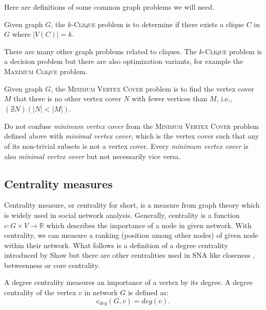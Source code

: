 Here are definitions of some common \NPh graph problems we will need.

\begin{definition}
    Given graph $G$, the $k$-\textsc{Clique} problem is to determine if
    there exists a clique $C$ in $G$ where $|V(C)| = k$.
\end{definition}
There are many other graph problems related to cliques. The $k$-\textsc{Clique} problem is a decision problem but
there are also optimization variants, for example the \textsc{Maximum Clique} problem.

\begin{definition}
    Given graph $G$, the \textsc{Minimum Vertex Cover} problem is to find
    the vertex cover $M$ that there is no other vertex cover $N$ with fewer vertices than $M$, i.e., 
    $(\nexists N)(|N| < |M|)$.
\end{definition}
Do not confuse \emph{minimum vertex cover} from the \textsc{Minimum Vertex Cover} problem defined above with \emph{minimal vertex cover},
which is the vertex cover such that any of its non-trivial subsets is not a vertex cover.
Every \emph{minimum vertex cover} is also \emph{minimal vertex cover} but not necessarily vice versa.


\subsection{Centrality measures}

Centrality measure, or centrality for short, is a measure from graph theory which is widely used in social network analysis.
Generally, centrality is a function $c: G \times V \rightarrow \mathbb{R}$ which describes the importance of a node in given network.
With centrality, we can measure a ranking (position among other nodes) of given node within their network.
What follows is a definition of a degree centrality introduced by Shaw \cite{Shaw1954} but there are other centralities used in SNA like
closeness \cite{Beauchamp1965}, betweenness \cite{Anthonisse1971,Freeman1977} or core \cite{Seidman1983} centrality.

\begin{definition}
    A degree centrality measures an importance of a vertex by its degree.
    A degree centrality of the vertex $v$ in network $G$ is defined as:
    $$c_{deg}(G, v) = deg(v).$$
\end{definition}


